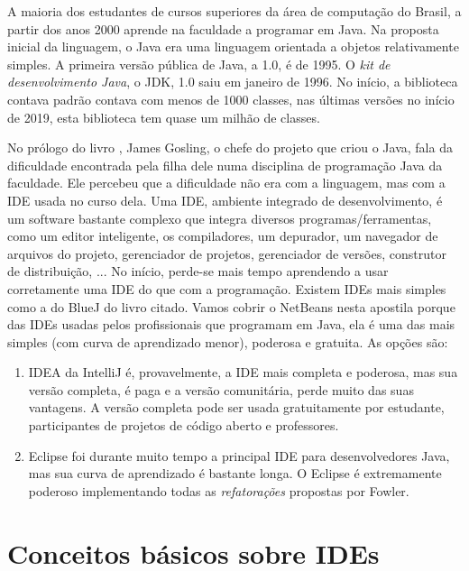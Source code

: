 \documentclass[
	12pt,				%
	twoside,			%
	a4paper,			%
	english,			%
	french,				%
	spanish,			%
	brazil				%
	]{abntex2}
\begin{document}
A maioria dos estudantes de cursos superiores da área de computação do Brasil, a partir dos anos 2000 aprende na faculdade a programar em Java. Na proposta inicial da linguagem, o Java era uma linguagem orientada a objetos relativamente simples. A primeira versão pública de Java, a 1.0, é de 1995. O \emph{kit de desenvolvimento Java}, o JDK, 1.0 saiu em janeiro de 1996. No início, a biblioteca contava padrão contava com menos de 1000 classes, nas últimas versões no início de 2019, esta biblioteca tem quase um milhão de classes.

No prólogo do livro \cite{livro-bluej}, James Gosling, o chefe do projeto que criou o Java, fala da dificuldade encontrada pela filha dele numa disciplina de programação Java da faculdade. Ele percebeu que a dificuldade não era com a linguagem, mas com a IDE usada no curso dela. Uma IDE, ambiente integrado de desenvolvimento, é um software bastante complexo que integra diversos programas/ferramentas, como um editor inteligente, os compiladores, um depurador, um navegador de arquivos do projeto, gerenciador de projetos, gerenciador de versões, construtor de distribuição, ... No início, perde-se mais tempo aprendendo a usar corretamente uma IDE do que com a programação. Existem IDEs mais simples como a do BlueJ do livro citado. Vamos cobrir o NetBeans nesta apostila porque das IDEs usadas pelos profissionais que programam em Java, ela é uma das mais simples (com curva de aprendizado menor), poderosa e gratuita. As opções são:
\begin{enumerate}
\item IDEA da IntelliJ é, provavelmente, a IDE mais completa e poderosa, mas sua versão completa, é paga e a versão comunitária, perde muito das suas vantagens. A versão completa pode ser usada gratuitamente por estudante, participantes de projetos de código aberto e professores.
\item Eclipse foi durante muito tempo a principal IDE para desenvolvedores Java, mas sua curva de aprendizado é bastante longa. O Eclipse é extremamente poderoso implementando todas as \emph{refatorações} propostas por Fowler.
\end{enumerate}

\section{Conceitos básicos sobre IDEs}
\end{document}
